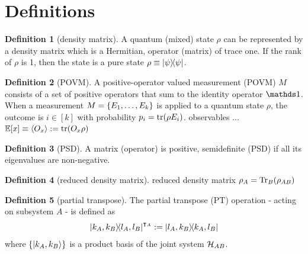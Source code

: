 \documentclass[
aps,
pra,
twocolumn,
floatfix,
]{revtex4-2}
\theoremstyle{plain}
\theoremstyle{definition}
\newtheorem{definition}{Definition}
\newtheorem{remark}{Remark}
\newcommand{\ob}{O}
\newcommand{\dm}{\rho}
\begin{document}
\section{Definitions}\label{sec:definitions}
\begin{definition}[density matrix]\label{def:density_matrix}
	A quantum (mixed) state $\dm$ can be represented by a density matrix which is a Hermitian,  operator (matrix) of trace one. 
	If the rank of $\dm$ is 1, then the state is a pure state $\dm\equiv\op{\psi}$.
\end{definition}
\begin{definition}[POVM]\label{def:povm}
	A positive-operator valued measurement (POVM) $M$ consists of a set of positive operators that sum to the identity operator $\identity$. 
	When a measurement $M = \qty{ E_1 , \dots , E_k }$ is applied to a quantum state $\dm$, the outcome is $i \in [k]$ with probability $p_i = \tr( \dm E_i )$.
	observables ... $\expectation[x]\equiv\expval{\ob_x}:=\tr(\ob_x\dm)$
\end{definition}
\begin{definition}[PSD]\label{def:psd}
	A matrix (operator) is positive, semidefinite (PSD) if all its eigenvalues are non-negative.
\end{definition}
\begin{definition}[reduced density matrix]\label{def:reduced_density_matrix}
	reduced density matrix $\dm_A = \Tr_B(\dm_{AB})$
\end{definition}
\begin{definition}[partial transpose]\label{def:partial_transpose}
	\cite{horodeckiSeparabilityMixedStates1996}
	The partial transpose (PT) operation - acting on subsystem $A$ - is defined as
	\begin{equation}
		\op{k_A,k_B}{l_A,l_B}^{\intercal_A}
		:= \op{l_A,k_B}{k_A,l_B}
	\end{equation}
	where $\qty{\ket{k_A,k_B}}$ is a product basis of the joint system $\mathcal{H}_{AB}$.
\end{definition}
\end{document}
